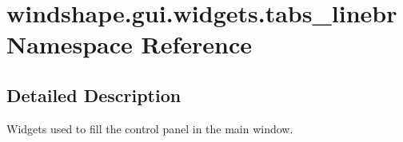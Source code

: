 \hypertarget{namespacewindshape_1_1gui_1_1widgets_1_1tabs__linebr}{}\section{windshape.\+gui.\+widgets.\+tabs\+\_\+linebr Namespace Reference}
\label{namespacewindshape_1_1gui_1_1widgets_1_1tabs__linebr}


\subsection{Detailed Description}
\begin{DoxyVerb}Widgets used to fill the control panel in the main window.
\end{DoxyVerb}
 